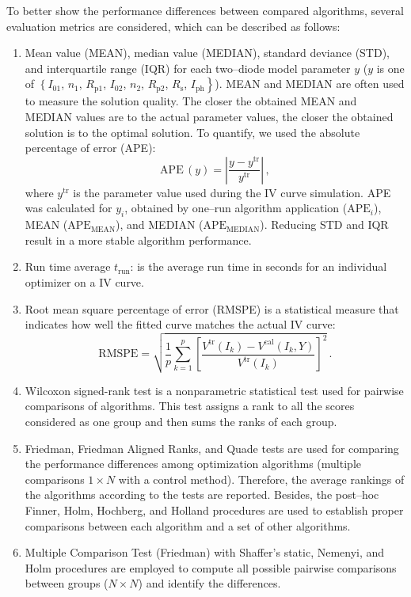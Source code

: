 \documentclass[a4paper,fleqn]{cas-dc}
\begin{document}
To better show the performance differences between compared algorithms,
several evaluation metrics are considered, which can be described as follows:
\begin{enumerate}[1.]
\item
Mean value (MEAN), median value (MEDIAN), standard deviance (STD), and interquartile range (IQR)
for each two--diode model parameter $y$
($y$ is one of $\left\{I_{01}\right.$, $n_1$, $R_\mathrm{p1}$, $I_{02}$, $n_2$, $R_\mathrm{p2}$, $R_\mathrm{s}$, $\left.I_\mathrm{ph}\right\}$).
MEAN and MEDIAN are often used to measure the solution quality.
The closer the obtained MEAN and MEDIAN values are to the actual parameter values,
the closer the obtained solution is to the optimal solution.
To quantify, we used the  absolute percentage of error (APE):
\begin{equation}
\label{eqAPE}
\mathrm{APE}\,(y)= \left| \frac{y-y^\mathrm{tr}}{y^\mathrm{tr}}\right|\,,
\end{equation}
where
$y^\mathrm{tr}$ is the parameter value used during the IV curve simulation.
APE was calculated for $y_i$, obtained by one--run algorithm application ($\mathrm{APE}_i$),
MEAN ($\mathrm{APE}_\mathrm{MEAN}$), and MEDIAN ($\mathrm{APE}_\mathrm{MEDIAN}$).
Reducing STD and IQR result in a more stable algorithm performance.

\item
Run time average $t_\mathrm{run}$: is the average run time in seconds for an
individual optimizer on a IV curve.

\item
Root mean square percentage of error (RMSPE) is a statistical measure that indicates
how well the fitted curve matches the actual IV curve:
\begin{equation}
\label{eqRMSPE}
\mathrm{RMSPE}= \sqrt{\frac{1}{p} \sum_{k=1}^p \left[\frac{V^\mathrm{tr}(I_k)-V^\mathrm{cal}(I_k,Y)}{V^\mathrm{tr}(I_k)} \right]^2}\,.
\end{equation}

\item
Wilcoxon signed-rank test is a nonparametric statistical test used for pairwise comparisons of algorithms.
This test assigns a rank to all the scores considered as one group and then sums the ranks of each group.

\item
Friedman, Friedman Aligned Ranks, and Quade tests are used for comparing the performance differences
among optimization algorithms
(multiple comparisons $1\times N$ with a control method).
Therefore, the average rankings of the algorithms according to the
tests are reported.
Besides, the post--hoc  Finner, Holm, Hochberg, and Holland procedures
are used to establish proper comparisons between each algorithm and a set of other algorithms.

\item
Multiple Comparison Test (Friedman) with Shaffer’s static, Nemenyi, and Holm procedures
are employed to compute all possible pairwise comparisons between groups ($N\times N$)
and identify the differences.

\end{enumerate}
\end{document}
